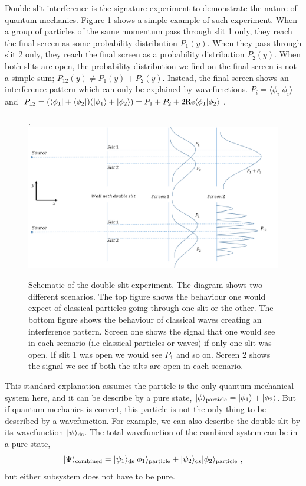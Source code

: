 \documentclass[aps,showpacs,onecolumn,floats,prd,superscriptaddress,nofootinbib]{revtex4-1}
\begin{document}
Double-slit interference is the signature experiment to demonstrate the nature of quantum mechanics. Figure 1 shows a simple example of such experiment.
When a group of particles of the same momentum pass through slit 1 only, they reach the final screen as some probability distribution $P_1(y)$. 
When they pass through slit 2 only, they reach the final screen as a probability distribution $P_2(y)$.
When both slits are open, the probability distribution we find on the final screen is not a simple sum; $P_{12}(y) \neq P_1(y) + P_2(y)$.
Instead, the final screen shows an interference pattern which can only be explained by wavefunctions.
$P_i = \langle \phi_i | \phi_i \rangle$ and $P_{12} = (\langle \phi_1|+\langle \phi_2| ) (|\phi_1\rangle + | \phi_2 \rangle)=P_1 + P_2 + 2{\rm Re}\langle\phi_1|\phi_2\rangle$.

\begin{figure}[h!]
\begin{center}.
\includegraphics[scale = 0.5]{DSe.pdf}
\caption{Schematic of the double slit experiment. The diagram shows two different scenarios. The top figure shows the behaviour one would expect of classical particles going through one slit or the other. The bottom figure shows the behaviour of classical waves creating an interference pattern. Screen one shows the signal that one would see in each scenario (i.e classical particles or waves) if only one slit was open. If slit 1 was open we would see $P_1$ and so on. Screen 2 shows the signal we see if both the silts are open in each scenario.}
\label{fig-doubleslit}
\end{center}
\end{figure}

This standard explanation assumes the particle is the only quantum-mechanical system here, and it can be describe by a pure state, $|\phi\rangle_{\rm particle} = |\phi_1\rangle + |\phi_2\rangle$.
But if quantum mechanics is correct, this particle is not the only thing to be described by a wavefunction. 
For example, we can also describe the double-slit by its wavefunction $|\psi\rangle_{\rm ds}$. The total wavefunction of the combined system can be in a pure state,
\begin{equation}
|\Psi\rangle_{\rm combined} = |\psi_1\rangle_{\rm ds}|\phi_1\rangle_{\rm particle} 
+ |\psi_2\rangle_{\rm ds}|\phi_2\rangle_{\rm particle} ~,
\end{equation}
but either subsystem does not have to be pure.
\end{document}
